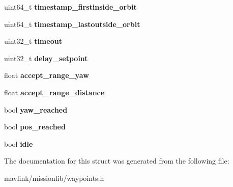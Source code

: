 \begin{DoxyCompactItemize}
\item 
\mbox{\label{structmavlink__wpm__storage_a48ca1926dbe7052fb6e2eb6b94627eb4}} 
uint64\+\_\+t {\bfseries timestamp\+\_\+firstinside\+\_\+orbit}
\item 
\mbox{\label{structmavlink__wpm__storage_ab4dc7dfa3b693283c9cffeebab202b92}} 
uint64\+\_\+t {\bfseries timestamp\+\_\+lastoutside\+\_\+orbit}
\item 
\mbox{\label{structmavlink__wpm__storage_ac88afbbfc25f5dc3c75a234bea412e25}} 
uint32\+\_\+t {\bfseries timeout}
\item 
\mbox{\label{structmavlink__wpm__storage_a83eca80631cd60d5e2224a5292ab7279}} 
uint32\+\_\+t {\bfseries delay\+\_\+setpoint}
\item 
\mbox{\label{structmavlink__wpm__storage_adeee2dd88714bb06a3b386f55d290056}} 
float {\bfseries accept\+\_\+range\+\_\+yaw}
\item 
\mbox{\label{structmavlink__wpm__storage_a3a60cd041821c337b5ecb576caf65fac}} 
float {\bfseries accept\+\_\+range\+\_\+distance}
\item 
\mbox{\label{structmavlink__wpm__storage_ad161b6732e68c9ae4294bdafb3cbcb68}} 
bool {\bfseries yaw\+\_\+reached}
\item 
\mbox{\label{structmavlink__wpm__storage_af1cf11449f14f504a19f0014cb551826}} 
bool {\bfseries pos\+\_\+reached}
\item 
\mbox{\label{structmavlink__wpm__storage_aa19d779596c32a9586d35cffac988859}} 
bool {\bfseries idle}
\end{DoxyCompactItemize}


The documentation for this struct was generated from the following file\+:\begin{DoxyCompactItemize}
\item 
mavlink/missionlib/waypoints.\+h\end{DoxyCompactItemize}

